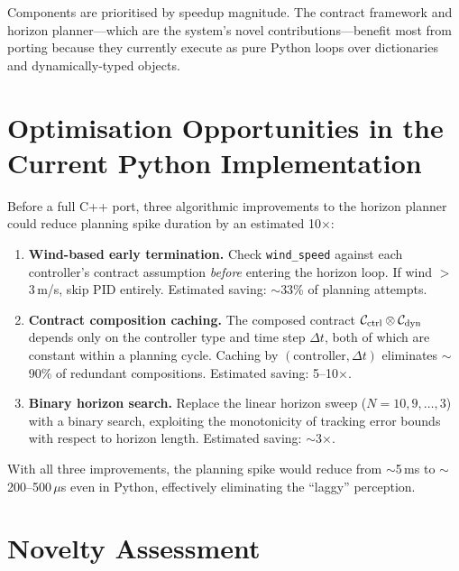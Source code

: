 Components are prioritised by speedup magnitude. The contract framework and horizon planner---which are the system's novel contributions---benefit most from porting because they currently execute as pure Python loops over dictionaries and dynamically-typed objects.

\section{Optimisation Opportunities in the Current Python Implementation}
\label{sec:python_optimisation}

Before a full C++ port, three algorithmic improvements to the horizon planner could reduce planning spike duration by an estimated 10$\times$:

\begin{enumerate}
    \item \textbf{Wind-based early termination.} Check \texttt{wind\_speed} against each controller's contract assumption \emph{before} entering the horizon loop. If wind $>$ 3\,m/s, skip PID entirely. Estimated saving: $\sim$33\% of planning attempts.

    \item \textbf{Contract composition caching.} The composed contract $\mathcal{C}_{\mathrm{ctrl}} \otimes \mathcal{C}_{\mathrm{dyn}}$ depends only on the controller type and time step $\Delta t$, both of which are constant within a planning cycle. Caching by $(\text{controller}, \Delta t)$ eliminates $\sim$90\% of redundant compositions. Estimated saving: 5--10$\times$.

    \item \textbf{Binary horizon search.} Replace the linear horizon sweep ($N = 10, 9, \ldots, 3$) with a binary search, exploiting the monotonicity of tracking error bounds with respect to horizon length. Estimated saving: $\sim$3$\times$.
\end{enumerate}

With all three improvements, the planning spike would reduce from $\sim$5\,ms to $\sim$200--500\,$\mu$s even in Python, effectively eliminating the ``laggy'' perception.

\section{Novelty Assessment}
\label{sec:novelty}

